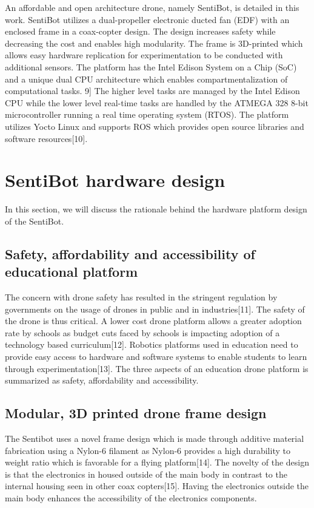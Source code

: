 \documentclass[12pt]{article}
\begin{document}
An affordable and open architecture drone, namely SentiBot, is detailed in this work. SentiBot utilizes a dual-propeller electronic ducted fan (EDF) with an enclosed frame in a coax-copter design. The design increases safety while decreasing the cost and enables high modularity. The frame is 3D-printed which allows easy hardware replication for experimentation to be conducted with additional sensors. The platform has the Intel Edison System on a Chip (SoC) and a unique dual CPU architecture which enables compartmentalization of computational tasks. 9] The higher level tasks are managed by the Intel Edison CPU while the lower level real-time tasks are handled by the ATMEGA 328 8-bit microcontroller running a real time operating system (RTOS). The platform utilizes Yocto Linux and supports ROS which provides open source libraries and software resources[10].

\section{SentiBot hardware design}

In this section, we will discuss the rationale behind the hardware platform design of the SentiBot.

\subsection{Safety, affordability and accessibility of educational platform}

The concern with drone safety has resulted in the stringent regulation by governments on the usage of drones in public and in industries[11]. The safety of the drone is thus critical. A lower cost drone platform allows a greater adoption rate by schools as budget cuts faced by schools is impacting adoption of a technology based curriculum[12]. Robotics platforms used in education need to provide easy access to hardware and software systems to enable students to learn through experimentation[13]. The three aspects of an education drone platform is summarized as safety, affordability and accessibility. 

\subsection{Modular, 3D printed drone frame design}

The Sentibot uses a novel frame design which is made through additive material fabrication using a Nylon-6 filament as Nylon-6 provides a high durability to weight ratio which is favorable for a flying platform[14]. The novelty of the design is that the electronics in housed outside of the main body in contrast to the internal housing seen in other coax copters[15]. Having the electronics outside the main body enhances the accessibility of the electronics components. 
\end{document}
